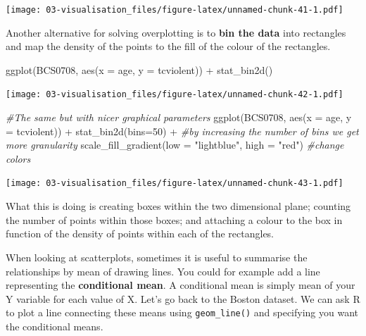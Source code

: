 \documentclass[
]{book}
\newenvironment{Shaded}{\begin{snugshade}}{\end{snugshade}}
\newcommand{\AttributeTok}[1]{\textcolor[rgb]{0.77,0.63,0.00}{#1}}
\newcommand{\CommentTok}[1]{\textcolor[rgb]{0.56,0.35,0.01}{\textit{#1}}}
\newcommand{\DecValTok}[1]{\textcolor[rgb]{0.00,0.00,0.81}{#1}}
\newcommand{\FunctionTok}[1]{\textcolor[rgb]{0.00,0.00,0.00}{#1}}
\newcommand{\NormalTok}[1]{#1}
\newcommand{\SpecialCharTok}[1]{\textcolor[rgb]{0.00,0.00,0.00}{#1}}
\newcommand{\StringTok}[1]{\textcolor[rgb]{0.31,0.60,0.02}{#1}}
\begin{document}
\texttt{[image: 03-visualisation\_files/figure-latex/unnamed-chunk-41-1.pdf]}

Another alternative for solving overplotting is to \textbf{bin the data} into rectangles and map the density of the points to the fill of the colour of the rectangles.

\begin{Shaded}
\begin{Highlighting}[]
\FunctionTok{ggplot}\NormalTok{(BCS0708, }\FunctionTok{aes}\NormalTok{(}\AttributeTok{x =}\NormalTok{ age, }\AttributeTok{y =}\NormalTok{ tcviolent)) }\SpecialCharTok{+}
  \FunctionTok{stat\_bin2d}\NormalTok{()}
\end{Highlighting}
\end{Shaded}

\texttt{[image: 03-visualisation\_files/figure-latex/unnamed-chunk-42-1.pdf]}

\begin{Shaded}
\begin{Highlighting}[]
\CommentTok{\#The same but with nicer graphical parameters}
\FunctionTok{ggplot}\NormalTok{(BCS0708, }\FunctionTok{aes}\NormalTok{(}\AttributeTok{x =}\NormalTok{ age, }\AttributeTok{y =}\NormalTok{ tcviolent)) }\SpecialCharTok{+}
  \FunctionTok{stat\_bin2d}\NormalTok{(}\AttributeTok{bins=}\DecValTok{50}\NormalTok{) }\SpecialCharTok{+} \CommentTok{\#by increasing the number of bins we get more granularity}
  \FunctionTok{scale\_fill\_gradient}\NormalTok{(}\AttributeTok{low =} \StringTok{"lightblue"}\NormalTok{, }\AttributeTok{high =} \StringTok{"red"}\NormalTok{) }\CommentTok{\#change colors}
\end{Highlighting}
\end{Shaded}

\texttt{[image: 03-visualisation\_files/figure-latex/unnamed-chunk-43-1.pdf]}

What this is doing is creating boxes within the two dimensional plane; counting the number of points within those boxes; and attaching a colour to the box in function of the density of points within each of the rectangles.

When looking at scatterplots, sometimes it is useful to summarise the relationships by mean of drawing lines. You could for example add a line representing the \textbf{conditional mean}. A conditional mean is simply mean of your Y variable for each value of X. Let's go back to the Boston dataset. We can ask R to plot a line connecting these means using \texttt{geom\_line()} and specifying you want the conditional means.
\end{document}
